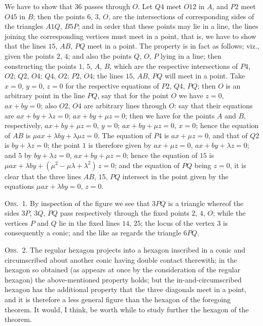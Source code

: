 \documentclass[11pt,a4paper]{article}
\begin{document}
We have to show that $36$ passes through $O$. Let $Q4$ meet $O12$ in $A$, and $P2$
meet $O45$ in $B$; then the points $6$, $3$, $O$, are the intersections of corresponding sides
of the triangles $A1Q$, $B5P$; and in order that these points may lie in a line, the
lines joining the corresponding vertices must meet in a point, that is, we have to show
that the lines $15$, $AB$, $PQ$ meet in a point. The property is in fact as follows; viz.,
given the points $2$, $4$; and also the points $Q$, $O$, $P$ lying in a line; then constructing
the points $1$, $5$, $A$, $B$, which are the respective intersections of $P4$, $O2$; $Q2$, $O4$;
$Q4$, $O2$; $P2$, $O4$; the lines $15$, $AB$, $PQ$ will meet in a point. Take $x=0$, $y=0$,
$z=0$ for the respective equations of $P2$, $Q4$, $PQ$; then $O$ is an arbitrary point in the
line $PQ$, say that for the point $O$ we have $z=0$, $ax+by=0$; also $O2$, $O4$ are
arbitrary lines through $O$: say that their equations are $ax+by+\lambda z=0$; $ax+by+\mu z=0$;
then we have for the points $A$ and $B$, respectively, $ax+by+\mu z=0$, $y=0$; $ax+by+\mu z=0$,
$x=0$; hence the equation of $AB$ is $\mu ax + \lambda by + \lambda\mu z = 0$. The equation of $P4$ is
$ax+\mu z=0$, and that of $Q2$ is $by+\lambda z=0$; the point $1$ is therefore given by
$ax+\mu z=0$, $ax+by+\lambda z=0$; and $5$ by $by+\lambda z=0$, $ax+by+\mu z=0$; hence the equation
of $15$ is $\mu ax + \lambda by + (\mu^2 - \mu\lambda + \lambda^2)\,z = 0$; and the equation of $PQ$ being $z=0$, it is
clear that the three lines $AB$, $15$, $PQ$ intersect in the point given by the equations
$\mu ax + \lambda by = 0$, $z=0$.

\textsc{Obs.~1.} By inspection of the figure we see that $3PQ$ is a triangle whereof the
sides $3P$, $3Q$, $PQ$ pass respectively through the fixed points $2$, $4$, $O$; while the vertices
$P$ and $Q$ lie in the fixed lines $14$, $25$; the locus of the vertex $3$ is consequently a
conic; and the like as regards the triangle $6PQ$.

\textsc{Obs.~2.} The regular hexagon projects into a hexagon inscribed in a conic and
circumscribed about another conic having double contact therewith; in the hexagon
so obtained (as appears at once by the consideration of the regular hexagon) the
above-mentioned property holds; but the in-and-circumscribed hexagon has the additional
property that the three diagonals meet in a point, and it is therefore a less general
figure than the hexagon of the foregoing theorem. It would, I think, be worth while
to study further the hexagon of the theorem.
\end{document}
